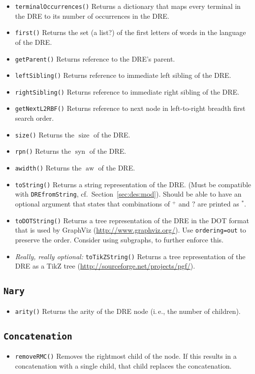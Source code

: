 \documentclass[a4paper,11pt, svgnames,titlepage]{article}
\newcommand{\rxp}{{^\mathtt{+}}}
\newcommand{\rxs}{{^\mathtt{*}}}
\newcommand{\rxo}{\mathtt{?}}
\DeclareMathOperator{\siz}{size}
\DeclareMathOperator{\syn}{syn}
\DeclareMathOperator{\aw}{aw}
\begin{document}
\begin{itemize}
	\item\texttt{terminalOccurrences()} Returns a dictionary that maps every terminal in the DRE to its number of occurrences in the DRE.
	\item\texttt{first()} Returns the set (a list?) of the first letters of words in the language of the DRE.
	\item\texttt{getParent()} Returns reference to the DRE's parent.
	\item\texttt{leftSibling()} Returns reference to immediate left sibling of the DRE.
	\item\texttt{rightSibling()} Returns reference to immediate right sibling of the DRE.
	\item\texttt{getNextL2RBF()} Returns reference to next node in left-to-right breadth first search order.
	\item\texttt{size()} Returns the $\siz$ of the DRE.
	\item\texttt{rpn()} Returns the $\syn$ of the DRE.
	\item\texttt{awidth()} Returns the $\aw$ of the DRE.
	\item\texttt{toString()} Returns a string representation of the DRE. (Must be compatible with \texttt{DREfromString}, cf.\ Section~\ref{sec:des:mod}). Should be able to have an optional argument that states that combinations of $\rxp$ and $\rxo$ are printed as $\rxs$.
	\item\texttt{toDOTString()} Returns a tree representation of the DRE in the DOT format that is used by GraphViz (\url{http://www.graphviz.org/}). Use \texttt{ordering=out} to preserve the order. Consider using subgraphs, to further enforce this.
	\item \emph{Really, really optional:} \texttt{toTikZString()} Returns a tree representation of the DRE as a TikZ tree (\url{http://sourceforge.net/projects/pgf/}).
\end{itemize}
\subsection{\texttt{Nary}}\label{sec:des:nary}
\begin{itemize}
	\item\texttt{arity()} Returns the arity of the DRE node (i.\,e., the number of children).
\end{itemize}

\subsection{\texttt{Concatenation}}\label{sec:des:conc}
\begin{itemize}
	\item\texttt{removeRMC()} Removes the rightmost child of the node. If this results in a concatenation with a single child, that child replaces the concatenation.
\end{itemize}
\end{document}
